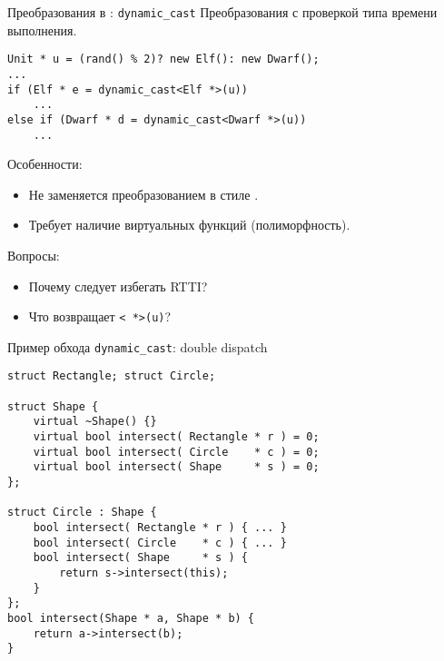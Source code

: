 \documentclass[aspectration=1610,t]{beamer}
\begin{document}
\begin{frame}[fragile]{Преобразования в \langcpp: {\tt dynamic\_cast}}
    Преобразования с проверкой типа времени выполнения.
    \begin{lstlisting}
Unit * u = (rand() % 2)? new Elf(): new Dwarf();
...
if (Elf * e = dynamic_cast<Elf *>(u))
    ...
else if (Dwarf * d = dynamic_cast<Dwarf *>(u))
    ...        
    \end{lstlisting}
\pause    
Особенности:
    \begin{itemize}
        \item Не заменяется преобразованием в стиле \langc.
        \item Требует наличие виртуальных функций (полиморфность).
    \end{itemize}
\pause
Вопросы:
\begin{itemize}
    \item Почему следует избегать RTTI?
    \item Что возвращает {\tt {}< *>(u)}?
\end{itemize}
\end{frame}

\begin{frame}[fragile]{Пример обхода \texttt{dynamic\_cast}: double dispatch}
\begin{lstlisting}
struct Rectangle; struct Circle;

struct Shape { 
    virtual ~Shape() {} 
    virtual bool intersect( Rectangle * r ) = 0;
    virtual bool intersect( Circle    * c ) = 0;
    virtual bool intersect( Shape     * s ) = 0;
};

struct Circle : Shape {
    bool intersect( Rectangle * r ) { ... }
    bool intersect( Circle    * c ) { ... }
    bool intersect( Shape     * s ) { 
        return s->intersect(this); 
    }
};
bool intersect(Shape * a, Shape * b) { 
    return a->intersect(b); 
}
\end{lstlisting}
\end{frame}
\end{document}

